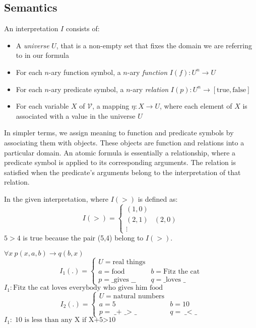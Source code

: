 \documentclass{article}
\begin{document}
\subsection*{Semantics}
An interpretation $I$ consists of:
\begin{itemize}
    \item A \textit{universe} $U$, that is a non-empty set that fixes the
    domain we are referring to in our formula
    \item For each $n$-ary function symbol, a $n$-ary \textit{function} $I(f):U^n\to U$
    \item For each $n$-ary predicate symbol, a $n$-ary \textit{relation}
    $I(p):U^n\to [\text{true},\text{false}]$
    \item For each variable $X$ of $\mathcal{V}$, a mapping $\eta : X\to U$,
    where each element of $X$ is associated with a value in the universe $U$
\end{itemize}
In simpler terms, we assign meaning to function and predicate symbols by
associating them with objects. These objects are function and relations into a
particular domain. An atomic formula is essentially a relationship, where a
predicate symbol is applied to its corresponding arguments.  The relation is
satisfied when the predicate's arguments belong to the interpretation of that
relation.
\begin{example}
    In the given interpretation, where $I(>)$ is defined as:
    $$I(>)=\begin{cases}
        (1,0) \\ 
        (2,1) & (2,0) \\ 
        \vdots
    \end{cases}$$
    $5>4$ is true because the pair (5,4) belong to $I(>)$.
\end{example}


\begin{example}
$\forall x\ p(x,a,b)\to q(b,x)$
$$I_1(.)=\begin{cases}
U=\text{real things} \\ 
a=\text{food} & b=\text{Fitz the cat}\\
p=\text{\_ gives \_ \_} & q=\text{\_ loves \_}
\end{cases}$$
$I_1:\text{Fitz the cat loves everybody who gives him food}$
$$I_2(.)=\begin{cases}
U=\text{natural numbers} \\ 
a=5 & b=10\\
p=\text{\_ + \_ $>$ \_} & q=\text{\_ $<$ \_}
\end{cases}$$
$I_1:\text{10 is less than any X if X+5$>$10}$
\end{example}
\end{document}
